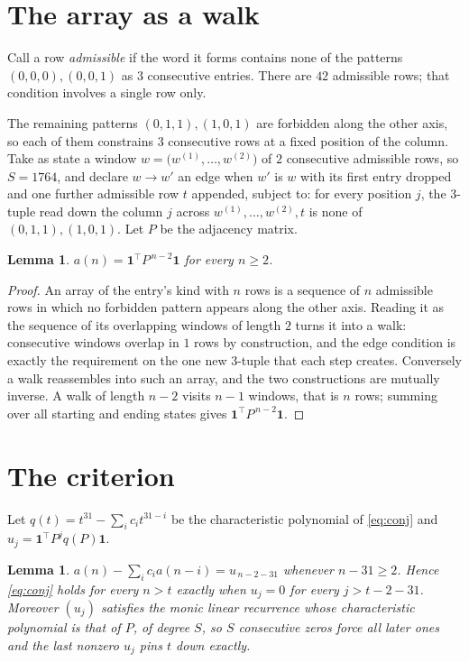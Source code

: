 \documentclass[11pt,a4paper]{article}
\theoremstyle{plain}
\newtheorem{lemma}[theorem]{Lemma}
\theoremstyle{definition}
\begin{document}
\section{The array as a walk}

Call a row \emph{admissible} if the word it forms contains none of the patterns
$(0,0,0), (0,0,1)$ as $3$ consecutive entries. There are $42$ admissible rows; that condition
involves a single row only.

The remaining patterns $(0,1,1), (1,0,1)$ are forbidden along the other axis, so each of them
constrains $3$ consecutive rows at a fixed position of the column. Take as state a
window $w=\bigl(w^{(1)},\dots,w^{(2)}\bigr)$ of $2$ consecutive admissible
rows, so $S=1764$, and declare $w\to w'$ an edge when $w'$ is $w$ with its first entry
dropped and one further admissible row $t$ appended, subject to: for every position
$j$, the $3$-tuple read down the column $j$ across $w^{(1)},\dots,w^{(2)},t$
is none of $(0,1,1), (1,0,1)$. Let $P$ be the adjacency matrix.

\begin{lemma}\label{lem:walk}
$a(n)=\mathbf{1}^{\!\top}P^{\,n-2}\mathbf{1}$ for every $n\ge2$.
\end{lemma}

\begin{proof}
An array of the entry's kind with $n$ rows is a sequence of $n$ admissible rows in
which no forbidden pattern appears along the other axis. Reading it as the sequence of its
overlapping windows of length $2$ turns it into a walk: consecutive windows overlap in
$1$ rows by construction, and the edge condition is exactly the requirement on the one
new $3$-tuple that each step creates. Conversely a walk reassembles into such an array,
and the two constructions are mutually inverse. A walk of length $n-2$ visits $n-1$
windows, that is $n$ rows; summing over all starting and ending states gives
$\mathbf{1}^{\!\top}P^{\,n-2}\mathbf{1}$.
\end{proof}

\section{The criterion}

Let $q(t)=t^{31}-\sum_i c_i t^{31-i}$ be the characteristic polynomial of
\eqref{eq:conj} and $u_j=\mathbf{1}^{\!\top}P^{j}q(P)\mathbf{1}$.

\begin{lemma}\label{lem:crit}
$a(n)-\sum_i c_i a(n-i)=u_{\,n-2-31}$ whenever $n-31\ge2$. Hence
\eqref{eq:conj} holds for every $n>t$ exactly when $u_j=0$ for every
$j>t-2-31$. Moreover $(u_j)$ satisfies the monic linear recurrence whose
characteristic polynomial is that of $P$, of degree $S$, so $S$ consecutive zeros force all
later ones and the last nonzero $u_j$ pins $t$ down exactly.
\end{lemma}
\end{document}
